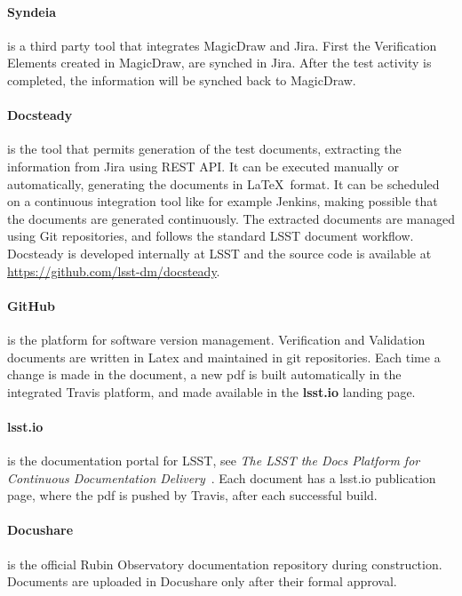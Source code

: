 \paragraph{Syndeia}
is a third party tool that integrates MagicDraw and Jira. First the Verification Elements created in MagicDraw,
are synched in Jira. After the test activity is completed, the information will be synched back to MagicDraw.

\paragraph{Docsteady}
is the tool that permits generation of the test documents, extracting the information from Jira using REST API.
It can be executed manually or automatically, generating the documents in \LaTeX~format.
It can be scheduled on a continuous integration tool like for example Jenkins, making possible that 
the documents are generated continuously.
The extracted documents are managed using Git repositories, and follows the  standard LSST document workflow.
Docsteady is developed internally at LSST and the source code is available at \url{https://github.com/lsst-dm/docsteady}.

\paragraph{GitHub}
is the platform for software version management.
Verification and Validation documents are written in Latex and maintained in git repositories.
Each time a change is made in the document, a new pdf is built automatically in the integrated Travis platform, and made available in the \textbf{lsst.io} landing page.

\paragraph{lsst.io}
is the documentation portal for LSST, see \textit{The LSST the Docs Platform for Continuous Documentation Delivery}\cite{SQR-006}~.
Each document has a lsst.io publication page, where the pdf is pushed by Travis, after each successful build.

\paragraph{Docushare}
is the official Rubin Observatory documentation repository during construction.
Documents are uploaded in Docushare only after their formal approval.


